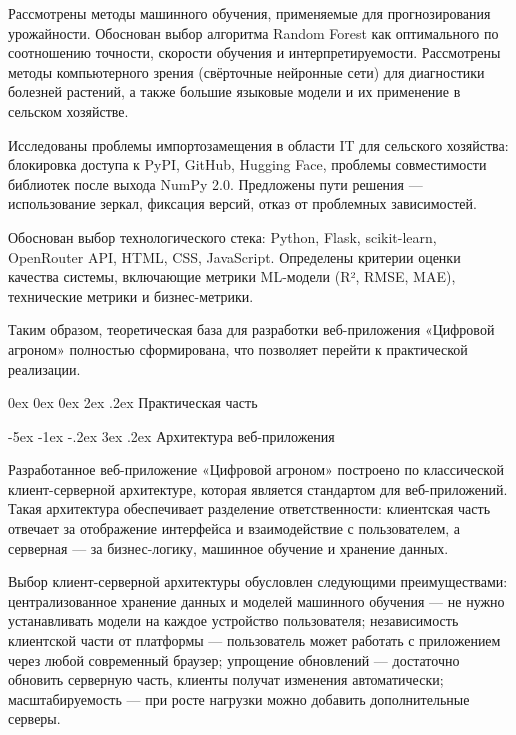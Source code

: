 \documentclass[14pt, a4paper]{extarticle}
\makeatletter
\renewcommand\section{\@startsection {section}{1}{\z@}%
    {0ex \@plus 0ex \@minus 0ex}%
    {2ex \@plus.2ex}%
    {\centering\normalfont\Large\bfseries}}
\renewcommand\subsection{\@startsection {subsection}{2}{\z@}%
    {-5ex \@plus -1ex \@minus -.2ex}%
    {3ex \@plus.2ex}%
    {\centering\large\bfseries}}
\makeatother
\begin{document}
    Рассмотрены методы машинного обучения, применяемые для прогнозирования урожайности. Обоснован выбор алгоритма Random Forest как оптимального по соотношению точности, скорости обучения и интерпретируемости. Рассмотрены методы компьютерного зрения (свёрточные нейронные сети) для диагностики болезней растений, а также большие языковые модели и их применение в сельском хозяйстве.

    Исследованы проблемы импортозамещения в области IT для сельского хозяйства: блокировка доступа к PyPI, GitHub, Hugging Face, проблемы совместимости библиотек после выхода NumPy 2.0. Предложены пути решения — использование зеркал, фиксация версий, отказ от проблемных зависимостей.

    Обоснован выбор технологического стека: Python, Flask, scikit-learn, OpenRouter API, HTML, CSS, JavaScript. Определены критерии оценки качества системы, включающие метрики ML-модели (R², RMSE, MAE), технические метрики и бизнес-метрики.

    Таким образом, теоретическая база для разработки веб-приложения «Цифровой агроном» полностью сформирована, что позволяет перейти к практической реализации.


\newpage
\section{Практическая часть}

\subsection{Архитектура веб-приложения}

    Разработанное веб-приложение «Цифровой агроном» построено по классической клиент-серверной архитектуре, которая является стандартом для веб-приложений. Такая архитектура обеспечивает разделение ответственности: клиентская часть отвечает за отображение интерфейса и взаимодействие с пользователем, а серверная — за бизнес-логику, машинное обучение и хранение данных.

    Выбор клиент-серверной архитектуры обусловлен следующими преимуществами: централизованное хранение данных и моделей машинного обучения — не нужно устанавливать модели на каждое устройство пользователя; независимость клиентской части от платформы — пользователь может работать с приложением через любой современный браузер; упрощение обновлений — достаточно обновить серверную часть, клиенты получат изменения автоматически; масштабируемость — при росте нагрузки можно добавить дополнительные серверы.
\end{document}
